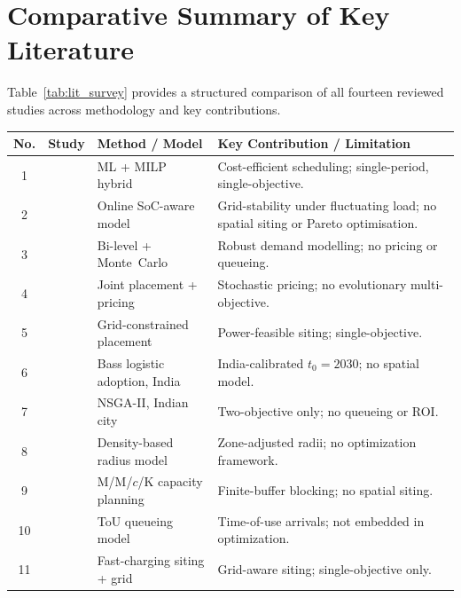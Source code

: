 \section{Comparative Summary of Key Literature}

Table~\ref{tab:lit_survey} provides a structured comparison of all fourteen
reviewed studies across methodology and key contributions.

\begin{table}[htbp]
\centering
\small
\setlength{\tabcolsep}{4pt}
\renewcommand{\arraystretch}{1.3}
\begin{tabular}{|c|p{9em}|p{10em}|p{17em}|}
\hline
\textbf{No.} & \textbf{Study} & \textbf{Method / Model} &
\textbf{Key Contribution / Limitation} \\
\hline
1  & \cite{palka_planning_2025}
   & ML + MILP hybrid
   & Cost-efficient scheduling; single-period, single-objective. \\
\hline
2  & \cite{wang_deadline_2025}
   & Online SoC-aware model
   & Grid-stability under fluctuating load; no spatial siting or Pareto
     optimisation. \\
\hline
3  & \cite{zhao_optimal_2023}
   & Bi-level + Monte~Carlo
   & Robust demand modelling; no pricing or queueing. \\
\hline
4  & \cite{li_joint_2022}
   & Joint placement + pricing
   & Stochastic pricing; no evolutionary multi-objective. \\
\hline
5  & \cite{xia_grid_2022}
   & Grid-constrained placement
   & Power-feasible siting; single-objective. \\
\hline
6  & \cite{kulkarni_bass_2021}
   & Bass logistic adoption, India
   & India-calibrated $t_0=2030$; no spatial model. \\
\hline
7  & \cite{paul_nsga2_2021}
   & NSGA-II, Indian city
   & Two-objective only; no queueing or ROI. \\
\hline
8  & \cite{bernardo_density_2021}
   & Density-based radius model
   & Zone-adjusted radii; no optimization framework. \\
\hline
9  & \cite{zhang_mmck_2019}
   & M/M/$c$/K capacity planning
   & Finite-buffer blocking; no spatial siting. \\
\hline
10 & \cite{tan_tou_2016}
   & ToU queueing model
   & Time-of-use arrivals; not embedded in optimization. \\
\hline
11 & \cite{sadeghi_fast_2014}
   & Fast-charging siting + grid
   & Grid-aware siting; single-objective only. \\

\end{tabular}
\end{table}

